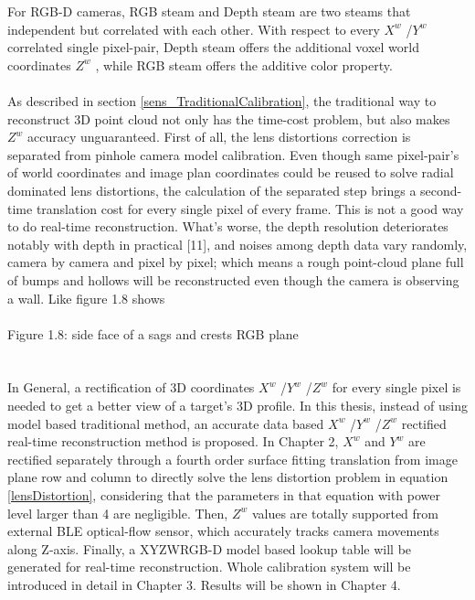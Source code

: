 	
For RGB-D cameras, RGB steam and Depth steam are two steams that independent but correlated with each other. With respect to every \(X^{w}\) /\(Y^{w}\)  correlated single pixel-pair, Depth steam offers the additional voxel world coordinates \(Z^{w}\) , while RGB steam offers the additive color property.
\\
\\As described in section \ref{sens_TraditionalCalibration}, the traditional way to reconstruct 3D point cloud not only has the time-cost problem, but also makes \(Z^{w}\) accuracy unguaranteed. First of all, the lens distortions correction is separated from pinhole camera model calibration. Even though same pixel-pair's of world coordinates and image plan coordinates could be reused to solve radial dominated lens distortions, the calculation of the separated step brings a second-time translation cost for every single pixel of every frame. This is not a good way to do real-time reconstruction. What's worse, the depth resolution deteriorates notably with depth in practical [11],
 and noises among depth data vary randomly, camera by camera and pixel by pixel; which means a rough point-cloud plane full of bumps and hollows will be reconstructed even though the camera is observing a wall. Like figure 1.8 shows%
\\\\Figure 1.8: side face of a sags and crests RGB plane 
\\\\
\\In General, a rectification of 3D coordinates \(X^{w}\) /\(Y^{w}\) /\(Z^{w}\)  for every single pixel is needed to get a better view of a target's 3D profile. In this thesis, instead of using model based traditional method, an accurate data based  \(X^{w}\) /\(Y^{w}\) /\(Z^{w}\) rectified real-time reconstruction method is proposed. In Chapter 2, \(X^{w}\) and \(Y^{w}\) are rectified separately through a fourth order surface fitting translation from image plane row and column to directly solve the lens distortion problem in equation \ref{lensDistortion}, considering that the parameters in that equation with power level larger than 4 are negligible. Then, \(Z^{w}\) values are totally supported from external BLE optical-flow sensor, which accurately tracks camera movements along Z-axis. Finally, a XYZWRGB-D model based lookup table will be generated for real-time reconstruction. Whole calibration system will be introduced in detail in Chapter 3. Results will be shown in Chapter 4.






